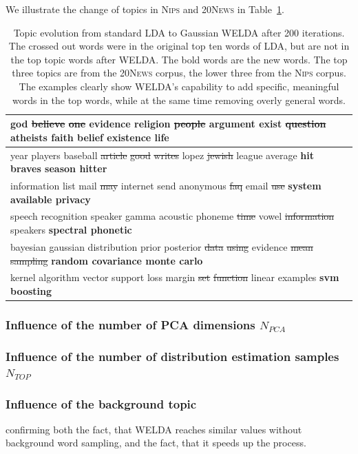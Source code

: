 \documentclass[
        a4paper,
        titlepage,
        twoside,
        parskip
        ]{scrbook}
\theoremstyle{break}
\begin{document}
We illustrate the change of topics in \textsc{Nips} and \textsc{20News} in Table~\ref{table:topic_development}.
\begin{table}[]
  \centering
  \caption{Topic evolution from standard LDA to Gaussian WELDA after 200 iterations. The crossed out words were in the original top ten words of LDA, but are not in the top topic words after WELDA. The bold words are the new words. The top three topics are from the \textsc{20News} corpus, the lower three from the \textsc{Nips} corpus. The examples clearly show WELDA's capability to add specific, meaningful words in the top words, while at the same time removing overly general words.}
  \label{table:topic_development}
  \begin{tabular}{p{13.5cm}}
    \hline
    god \st{believe} \st{one} evidence religion \st{people} argument exist \st{question} atheists \textbf{faith belief existence life} \\
    \hline
    year players baseball \st{article} \st{good} \st{writes} lopez \st{jewish} league average \textbf{hit braves season hitter} \\
    \hline
    information list mail \st{may} internet send anonymous \st{faq} email \st{use} \textbf{system available privacy} \\
    \hline
    \hline
    speech recognition speaker gamma acoustic phoneme \st{time} vowel \st{information} speakers \textbf{spectral phonetic} \\
    \hline
    bayesian gaussian distribution prior posterior \st{data} \st{using} evidence \st{mean} \st{sampling} \textbf{random covariance monte carlo} \\
    \hline
    kernel algorithm vector support loss margin \st{set} \st{function} linear examples \textbf{svm boosting} \\
    \hline
  \end{tabular}
\end{table}

\subsubsection{Influence of the number of PCA dimensions $N_{PCA}$}
\subsubsection{Influence of the number of distribution estimation samples $N_{TOP}$}
\subsubsection{Influence of the background topic}
confirming both the fact, that WELDA reaches similar values without background word sampling, and the fact, that it speeds up the process.
\end{document}
